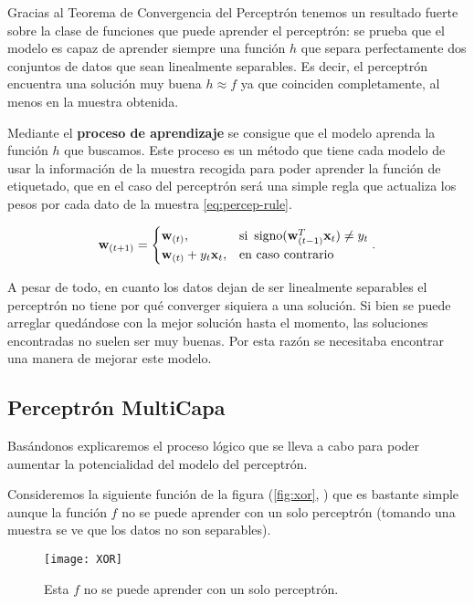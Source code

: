 Gracias al Teorema de Convergencia del Perceptrón \cite{novikoff1963convergence} tenemos un resultado fuerte sobre la clase de funciones que puede aprender el perceptrón: se prueba que el modelo es capaz de aprender siempre una función $h$ que separa perfectamente dos conjuntos de datos que sean linealmente separables. Es decir, el perceptrón encuentra una solución muy buena $h \approx f$ ya que coinciden completamente, al menos en la muestra obtenida.

Mediante el \textbf{proceso de aprendizaje} se consigue que el modelo aprenda la función $h$ que buscamos. Este proceso es un método que tiene cada modelo de usar la información de la muestra recogida para poder aprender la función de etiquetado, que en el caso del perceptrón será una simple regla que actualiza los pesos por cada dato de la muestra \eqref{eq:percep-rule}.

\begin{equation}
  \textbf{w}_{(t + 1)} =
  \begin{cases}
    \textbf{w}_{(t)}, & \text{si } \operatorname{signo}(\textbf{w}^T_{(t-1)} \textbf{x}_t) \neq y_t \\
    \textbf{w}_{(t)} + y_t \textbf{x}_t, & \text{en caso contrario}
  \end{cases}.
  \label{eq:percep-rule}
\end{equation}

A pesar de todo, en cuanto los datos dejan de ser linealmente separables el perceptrón no tiene por qué converger siquiera a una solución. Si bien se puede arreglar quedándose con la mejor solución hasta el momento, las soluciones encontradas no suelen ser muy buenas. Por esta razón se necesitaba encontrar una manera de mejorar este modelo.

\subsection{Perceptrón MultiCapa}

Basándonos \cite{abu2012learning} explicaremos el proceso lógico que se lleva a cabo para poder aumentar la potencialidad del modelo del perceptrón.

Consideremos la siguiente función de la figura (\autoref{fig:xor}, \cite{abu2012learning}) que es bastante simple aunque la función $f$ no se puede aprender con un solo perceptrón (tomando una muestra se ve que los datos no son separables).

\begin{figure}[htpb]
  \centering
  \texttt{[image: XOR]}
  \caption{Esta $f$ no se puede aprender con un solo perceptrón.}
  \label{fig:xor}
\end{figure}

